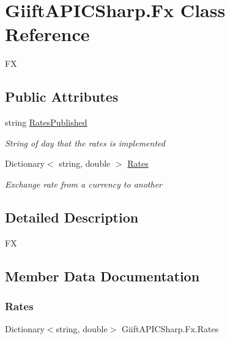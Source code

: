\hypertarget{class_giift_a_p_i_c_sharp_1_1_fx}{}\section{Giift\+A\+P\+I\+C\+Sharp.\+Fx Class Reference}
\label{class_giift_a_p_i_c_sharp_1_1_fx}


FX  


\subsection*{Public Attributes}
\begin{DoxyCompactItemize}
\item 
string \hyperlink{class_giift_a_p_i_c_sharp_1_1_fx_a2c94740f3666608ee8469846fd628d94}{Rates\+Published}
\begin{DoxyCompactList}\small\item\em String of day that the rates is implemented \end{DoxyCompactList}\item 
Dictionary$<$ string, double $>$ \hyperlink{class_giift_a_p_i_c_sharp_1_1_fx_aeae46a6428e75cd033f0a4fb9d2a201c}{Rates}
\begin{DoxyCompactList}\small\item\em Exchange rate from a currency to another \end{DoxyCompactList}\end{DoxyCompactItemize}


\subsection{Detailed Description}
FX 



\subsection{Member Data Documentation}
\mbox{\label{class_giift_a_p_i_c_sharp_1_1_fx_aeae46a6428e75cd033f0a4fb9d2a201c}} 
\subsubsection{\texorpdfstring{Rates}{Rates}}
{\footnotesize\ttfamily Dictionary$<$string, double$>$ Giift\+A\+P\+I\+C\+Sharp.\+Fx.\+Rates}



